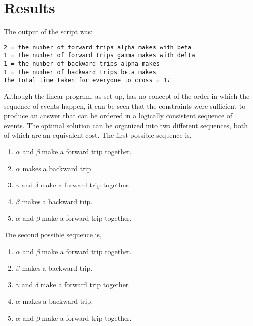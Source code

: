 \documentclass{article}
\begin{document}
\section{Results}

The output of the script was:

\begin{verbatim}
2 = the number of forward trips alpha makes with beta
1 = the number of forward trips gamma makes with delta
1 = the number of backward trips alpha makes
1 = the number of backward trips beta makes
The total time taken for everyone to cross = 17
\end{verbatim}

Although the linear program, as set up, has no concept of the order in which the sequence of events happen, it can be seen that the constraints were sufficient to produce an answer that can be ordered in a logically consistent sequence of events.
The optimal solution can be organized into two different sequences, both of which are an equivalent cost.
The first possible sequence is,

\begin{enumerate}
\item $\alpha$ and $\beta$ make a forward trip together.
\item $\alpha$ makes a backward trip.
\item $\gamma$ and $\delta$ make a forward trip together.
\item $\beta$ makes a backward trip.
\item $\alpha$ and $\beta$ make a forward trip together.
\end{enumerate}

\noindent The second possible sequence is,

\begin{enumerate}
\item $\alpha$ and $\beta$ make a forward trip together.
\item $\beta$ makes a backward trip.
\item $\gamma$ and $\delta$ make a forward trip together.
\item $\alpha$ makes a backward trip.
\item $\alpha$ and $\beta$ make a forward trip together.
\end{enumerate}
\end{document}

